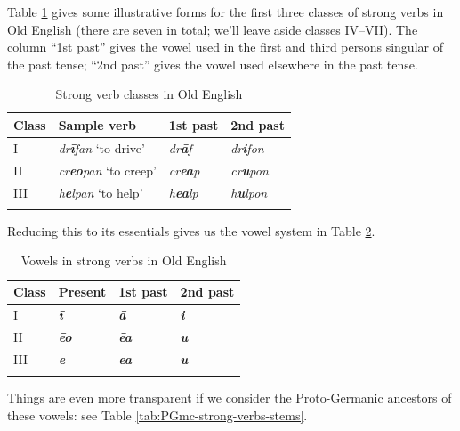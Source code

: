 Table \ref{tab:OE-strong-verbs} gives some illustrative forms for the first three classes of strong verbs in Old English (there are seven in total; we'll leave aside classes IV--VII). The column ``1st past'' gives the vowel used in the first and third persons singular of the past tense; ``2nd past'' gives the vowel used elsewhere in the past tense.

\begin{table}
    \begin{tabularx}{\textwidth}{XXXl}
        \lsptoprule
    \textbf{Class} & \textbf{Sample verb} & \textbf{1st past}  & \textbf{2nd past} \\
    \midrule
    I & \emph{dr\textbf{ī}fan} `to drive' & \emph{dr\textbf{ā}f} & \emph{dr\textbf{i}fon} \\
    II & \emph{cr\textbf{ēo}pan} `to creep' & \emph{cr\textbf{ēa}p} & \emph{cr\textbf{u}pon} \\
    III & \emph{h\textbf{e}lpan} `to help' & \emph{h\textbf{ea}lp} & \emph{h\textbf{u}lpon} \\
    \lspbottomrule
    \end{tabularx}
    \caption{Strong verb classes in Old English}
    \label{tab:OE-strong-verbs}
\end{table}

\noindent Reducing this to its essentials gives us the vowel system in Table \ref{tab:OE-strong-verbs-vowels}.

\begin{table}
    \begin{tabularx}{\textwidth}{XXXl}
        \lsptoprule
    \textbf{Class} & \textbf{Present} & \textbf{1st past} & \textbf{2nd past}\\
    \midrule
    I & \emph{\textbf{ī}} & \emph{\textbf{ā}} & \emph{\textbf{i}} \\
    II & \emph{\textbf{ēo}} & \emph{\textbf{ēa}} & \emph{\textbf{u}} \\
    III & \emph{\textbf{e}} & \emph{\textbf{ea}} & \emph{\textbf{u}} \\
    \lspbottomrule
    \end{tabularx}
    \caption{Vowels in strong verbs in Old English}
    \label{tab:OE-strong-verbs-vowels}
\end{table}

\noindent Things are even more transparent if we consider the Proto-Germanic ancestors of these vowels: see Table \ref{tab:PGmc-strong-verbs-stems}.

